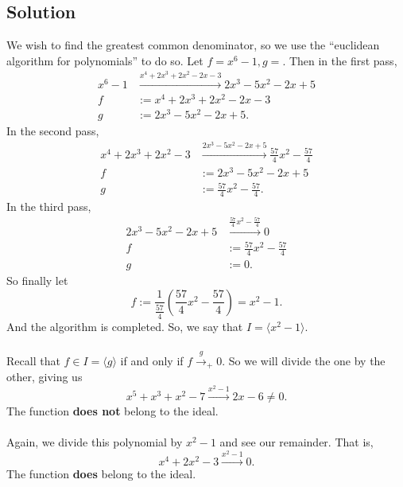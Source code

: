 \documentclass{article}
\theoremstyle{definition}
\begin{document}
\subsection*{Solution}
We wish to find the greatest common denominator, so we use the ``euclidean algorithm for polynomials'' to do so.
Let $f = x^6 - 1, g = $. Then in the first pass,
\begin{align*}
    x^6 - 1 & \xrightarrow{x^4 + 2x^3 + 2x^2 - 2x - 3} 2x^3 - 5x^2 - 2x +5 \\
    f &:=x^4 + 2x^3 + 2x^2 - 2x - 3 \\
    g &:= 2x^3 - 5x^2 - 2x +5
.\end{align*}
In the second pass,
\begin{align*}
    x^4 + 2x^3 + 2x^2 - 3 &\xrightarrow{ 2x^3 - 5x^2 - 2x +5} \frac{57}{4}x^2 - \frac{57}{4} \\
    f &:= 2x^3 - 5x^2 - 2x +5 \\
    g &:= \frac{57}{4}x^2 - \frac{57}{4} 
.\end{align*}
In the third pass,
\begin{align*}
    2x^3 - 5x^2 - 2x +5 &\xrightarrow{\frac{57}{4}x^2 - \frac{57}{4}} 0 \\
    f &:= \frac{57}{4}x^2 - \frac{57}{4} \\
    g &:= 0
.\end{align*}
So finally let 
\[
    f := \frac{1}{\frac{57}{4}}\left(\frac{57}{4}x^2 - \frac{57}{4}\right) = x^2 - 1
.\]
And the algorithm is completed. So, we say that $I = \langle x^2 - 1 \rangle$. \\\\
Recall that $f \in I = \langle g\rangle$ if and only if $f \xrightarrow{g}_+ 0$.
So we will divide the one by the other, giving us 
\[
    x^5 + x^3 + x^2 - 7 \xrightarrow{x^2 - 1} 2x - 6 \neq 0
.\]
The function \textbf{does not} belong to the ideal.\\\\
 Again, we divide this polynomial by $x^2 - 1$ and see our 
remainder. That is,
\[
    x^4 + 2x^2 - 3 \xrightarrow{x^2 - 1} 0  
.\]
The function \textbf{does} belong to the ideal.
\end{document}
